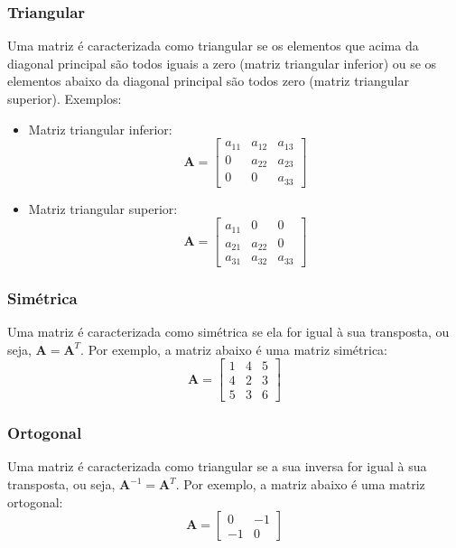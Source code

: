 \subsubsection{Triangular}

Uma matriz é caracterizada como triangular se os elementos que acima da diagonal principal são todos iguais a zero (matriz triangular inferior) ou se os elementos abaixo da diagonal principal são todos zero (matriz triangular superior). Exemplos:

\begin{itemize}

\item Matriz triangular inferior:
\[
    \mathbf{A} = 
    \begin{bmatrix}
        a_{11} & a_{12} & a_{13} \\
        0 & a_{22} & a_{23} \\
        0 & 0 & a_{33}
    \end{bmatrix}
\]

\item Matriz triangular superior:
\[
    \mathbf{A} = 
    \begin{bmatrix}
        a_{11} & 0 & 0 \\
        a_{21} & a_{22} & 0 \\
        a_{31} & a_{32} & a_{33}
    \end{bmatrix}
\]
\end{itemize}

\subsubsection{Simétrica}
Uma matriz é caracterizada como simétrica se ela for igual à sua transposta, ou seja, $\mathbf{A} = \mathbf{A}^T$. Por exemplo, a matriz abaixo é uma matriz simétrica:
\[
    \mathbf{A} = 
    \begin{bmatrix}
        1 & 4 & 5 \\ 
        4 & 2 & 3 \\
        5 & 3 & 6
    \end{bmatrix}
\]


\subsubsection{Ortogonal}
Uma matriz é caracterizada como triangular se  a sua inversa for igual à sua transposta, ou seja, $\mathbf{A}^{-1} = \mathbf{A}^T$. Por exemplo, a matriz abaixo é uma matriz ortogonal:
\[
    \mathbf{A} = 
    \begin{bmatrix} 
        0 & -1 \\
        -1 & 0
    \end{bmatrix}   
\]

